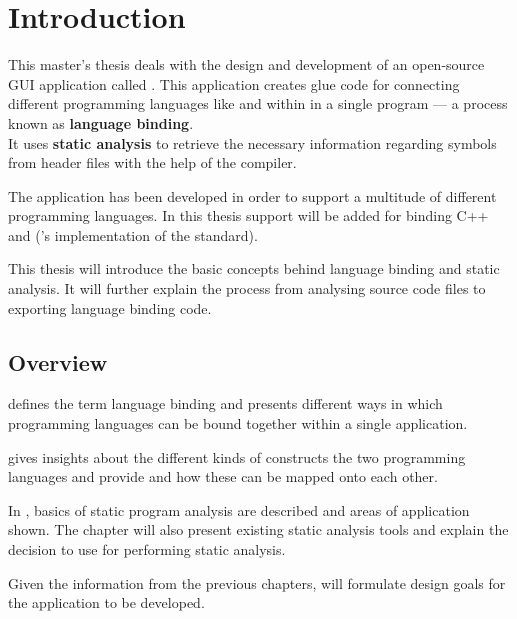 \chapter{Introduction}

This master's thesis deals with the design and development of an open-source GUI application called . This application creates glue code for connecting different programming languages like  and  within in a single \linebreak program --- a process known as \textbf{language binding}.\\
It uses \textbf{static analysis} to retrieve the necessary information regarding symbols from  header files with the help of the   compiler.

The application has been developed in order to support a multitude of different \linebreak programming languages. In this thesis support will be added for binding C++ and  ('s implementation of the  standard).

This thesis will introduce the basic concepts behind language binding and static analysis. It will further explain the process from analysing source code files to exporting language binding code.

\section{Overview}

 defines the term language binding and presents different ways in which programming languages can be bound together within a single application.

 gives insights about the different kinds of constructs the two programming languages  and  provide and how these can be mapped onto each other.

In , basics of static program analysis are described and areas of application shown. The chapter will also present existing static analysis tools and explain the decision to use  for performing static analysis.

Given the information from the previous chapters,  will formulate design goals for the application to be developed.

